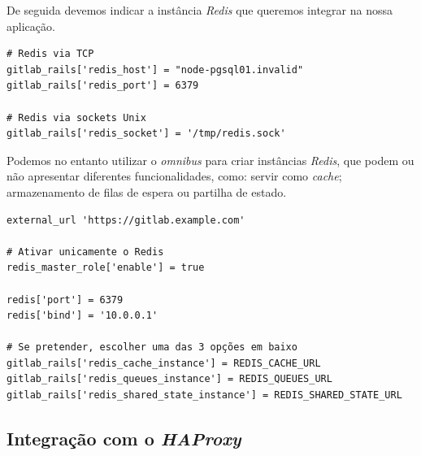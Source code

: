 \documentclass[12pt,a4paper]{article}
\begin{document}
De seguida devemos indicar a instância \emph{Redis} que queremos integrar na nossa aplicação.

\begin{verbatim}
# Redis via TCP
gitlab_rails['redis_host'] = "node-pgsql01.invalid"  
gitlab_rails['redis_port'] = 6379

# Redis via sockets Unix
gitlab_rails['redis_socket'] = '/tmp/redis.sock'
\end{verbatim}

Podemos no entanto utilizar o \emph{omnibus} para criar instâncias \emph{Redis}, que podem ou não apresentar diferentes funcionalidades, como: servir como \emph{cache}; armazenamento de filas de espera ou partilha de estado.

\begin{verbatim}
external_url 'https://gitlab.example.com'
 
# Ativar unicamente o Redis
redis_master_role['enable'] = true
 
redis['port'] = 6379
redis['bind'] = '10.0.0.1'

# Se pretender, escolher uma das 3 opções em baixo
gitlab_rails['redis_cache_instance'] = REDIS_CACHE_URL
gitlab_rails['redis_queues_instance'] = REDIS_QUEUES_URL
gitlab_rails['redis_shared_state_instance'] = REDIS_SHARED_STATE_URL
\end{verbatim}



\iffalse
\newpage
\subsection{Integração com o \emph{HAProxy}}
\end{document}
